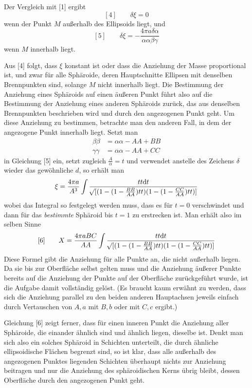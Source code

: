 Der Vergleich mit [1] ergibt
\[
[4]\qquad\delta\xi=0
\]
wenn der Punkt $M$ außerhalb des Ellipsoids liegt, und
\[
[5]\qquad\delta\xi=-\frac{4\pi a\delta\alpha}{\alpha\alpha\beta\gamma}
\]
wenn $M$ innerhalb liegt.

Aus [4] folgt, dass $\xi$ konstant ist oder dass die Anziehung der Masse proportional ist, und zwar für alle Sphäroide, deren Hauptschnitte Ellipsen mit denselben Brennpunkten sind, solange $M$ nicht innerhalb liegt. Die Bestimmung der Anziehung eines Sphäroids auf einen äußeren Punkt führt also auf die Bestimmung der Anziehung eines anderen Sphäroids zurück, das aus denselben Brennpunkten beschrieben wird und durch den angezogenen Punkt geht. Um diese Anziehung zu bestimmen, betrachte man den anderen Fall, in dem der angezogene Punkt innerhalb liegt. Setzt man
\[
\begin{aligned}
\beta\beta&=\alpha\alpha-AA+BB\\
\gamma\gamma&=\alpha\alpha-AA+CC
\end{aligned}
\]
in Gleichung [5] ein, setzt zugleich $\frac{A}{\alpha}=t$ und verwendet anstelle des Zeichens $\delta$ wieder das gewöhnliche $d$, so erhält man
\[
\xi=\frac{4\pi a}{A^3}\int\frac{tt\mathrm{d}t}{\mathord{{}^{}\!\surd}[(1-(1-\frac{BB}{AA})tt)(1-(1-\frac{CC}{AA})tt)]}
\]
wobei das Integral so festgelegt werden muss, dass es für $t=0$ verschwindet und dann für das \textit{bestimmte} Sphäroid bis $t=1$ zu erstrecken ist. Man erhält also im selben Sinne
\[
[6]\qquad X=\frac{4\pi aBC}{AA}\int\frac{tt\mathrm{d}t}{\mathord{{}^{}\!\surd}[(1-(1-\frac{BB}{AA})tt)(1-(1-\frac{CC}{AA})tt)]}
\]
Diese Formel gibt die Anziehung für alle Punkte an, die nicht außerhalb liegen. Da sie bis zur Oberfläche selbst gelten muss und die Anziehung äußerer Punkte bereits auf die Anziehung der Punkte auf der Oberfläche zurückgeführt wurde, ist die Aufgabe damit vollständig gelöst. (Es braucht kaum erwähnt zu werden, dass sich die Anziehung parallel zu den beiden anderen Hauptachsen jeweils einfach durch Vertauschen von $A,a$ mit $B,b$ oder mit $C,c$ ergibt.)

Gleichung [6] zeigt ferner, dass für einen inneren Punkt die Anziehung aller Sphäroide, die einander ähnlich sind und ähnlich liegen, dieselbe ist. Denkt man sich also ein solches Sphäroid in Schichten unterteilt, die durch ähnliche ellipsoidische Flächen begrenzt sind, so ist klar, dass alle außerhalb des angezogenen Punktes liegenden Schichten überhaupt nichts zur Anziehung beitragen und nur die Anziehung des sphäroidischen Kerns übrig bleibt, dessen Oberfläche durch den angezogenen Punkt geht.

